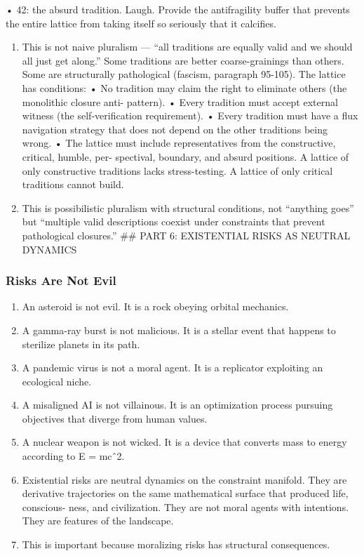 \documentclass[
]{article}
\providecommand{\tightlist}{%
  \setlength{\itemsep}{0pt}\setlength{\parskip}{0pt}}
\begin{document}
• 42: the absurd tradition. Laugh. Provide the antifragility buffer that
prevents the entire lattice from taking itself so seriously that it
calcifies.

\begin{enumerate}
\def\labelenumi{\arabic{enumi}.}
\setcounter{enumi}{207}
\item
  This is not naive pluralism --- ``all traditions are equally valid and
  we should all just get along.'' Some traditions are better
  coarse-grainings than others. Some are structurally pathological
  (fascism, paragraph 95-105). The lattice has conditions: • No
  tradition may claim the right to eliminate others (the monolithic
  closure anti- pattern). • Every tradition must accept external witness
  (the self-verification requirement). • Every tradition must have a
  flux navigation strategy that does not depend on the other traditions
  being wrong. • The lattice must include representatives from the
  constructive, critical, humble, per- spectival, boundary, and absurd
  positions. A lattice of only constructive traditions lacks
  stress-testing. A lattice of only critical traditions cannot build.
\item
  This is possibilistic pluralism with structural conditions, not
  ``anything goes'' but ``multiple valid descriptions coexist under
  constraints that prevent pathological closures.'' \#\# PART 6:
  EXISTENTIAL RISKS AS NEUTRAL DYNAMICS
\end{enumerate}

\subsubsection{Risks Are Not Evil}\label{risks-are-not-evil}

\begin{enumerate}
\def\labelenumi{\arabic{enumi}.}
\setcounter{enumi}{209}
\tightlist
\item
  An asteroid is not evil. It is a rock obeying orbital mechanics.
\item
  A gamma-ray burst is not malicious. It is a stellar event that happens
  to sterilize planets in its path.
\item
  A pandemic virus is not a moral agent. It is a replicator exploiting
  an ecological niche.
\item
  A misaligned AI is not villainous. It is an optimization process
  pursuing objectives that diverge from human values.
\item
  A nuclear weapon is not wicked. It is a device that converts mass to
  energy according to E = mcˆ2.
\item
  Existential risks are neutral dynamics on the constraint manifold.
  They are derivative trajectories on the same mathematical surface that
  produced life, conscious- ness, and civilization. They are not moral
  agents with intentions. They are features of the landscape.
\item
  This is important because moralizing risks has structural
  consequences.
\end{enumerate}
\end{document}
